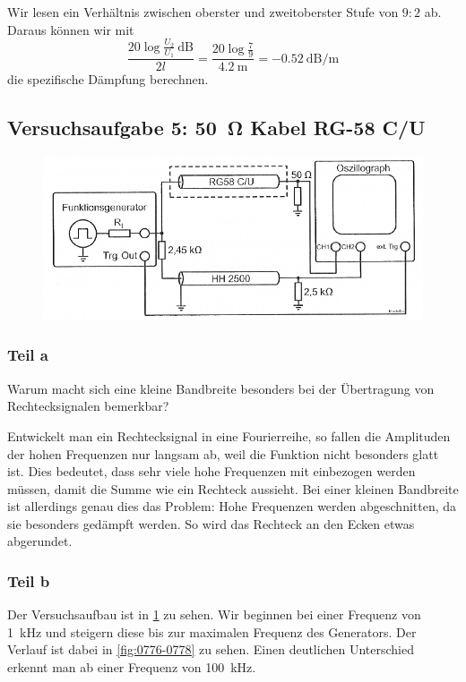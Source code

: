 Wir lesen ein Verhältnis zwischen oberster und zweitoberster Stufe von $9 : 2$
ab. Daraus können wir mit
\[\frac{20\log\frac{U_2}{U_1}\SI{}{\deci\bel}}{2l} = \frac{20\log\frac79}{\SI{4.2}{\meter}} = \SI{-0.52}{\deci\bel\per\meter}\]
die spezifische Dämpfung berechnen.

\FloatBarrier
\subsection{Versuchsaufgabe 5: \SI{50}{\ohm} Kabel RG-58 C/U}

\begin{figure}[htbp]
	\centering
	\includegraphics[width=.7\textwidth]{Schaltplan/1-11.png}
	\caption{%
		\cite[Abbildung~1.11]{physik313-Anleitung}
	}
	\label{fig:1-11}
\end{figure}

\subsubsection{Teil a}

\begin{problem}
	Warum macht sich eine kleine Bandbreite besonders bei der Übertragung von
	Rechtecksignalen bemerkbar?
\end{problem}

Entwickelt man ein Rechtecksignal in eine Fourierreihe, so fallen die
Amplituden der hohen Frequenzen nur langsam ab, weil die Funktion nicht
besonders glatt ist. Dies bedeutet, dass sehr viele hohe Frequenzen mit
einbezogen werden müssen, damit die Summe wie ein Rechteck aussieht. Bei einer
kleinen Bandbreite ist allerdings genau dies das Problem: Hohe Frequenzen
werden abgeschnitten, da sie besonders gedämpft werden. So wird das Rechteck an
den Ecken etwas abgerundet.

\subsubsection{Teil b}

Der Versuchsaufbau ist in \ref{fig:1-11} zu sehen. Wir beginnen bei einer Frequenz von \SI{1}{\kilo\hertz} und steigern diese bis zur maximalen Frequenz des Generators. Der Verlauf ist dabei in \ref{fig:0776-0778} zu sehen. Einen deutlichen Unterschied erkennt man ab einer Frequenz von \SI{100}{\kilo\hertz}.

